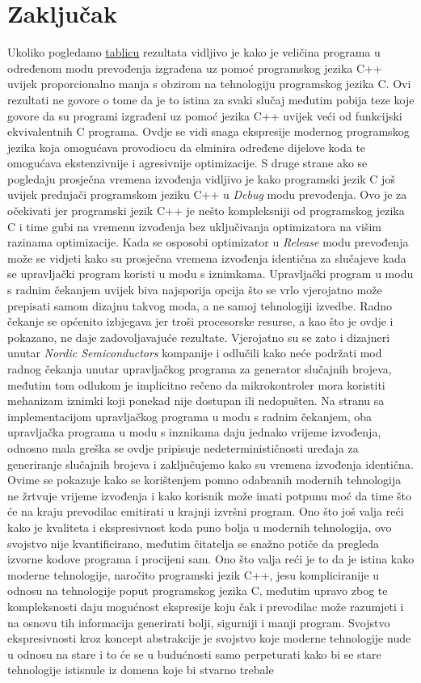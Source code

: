 \chapter{Zaključak}
Ukoliko pogledamo \hyperref[table:results]{tablicu} rezultata vidljivo je kako je veličina programa u određenom modu prevođenja izgrađena uz pomoć programskog jezika C++ uvijek proporcionalno manja s obzirom na tehnologiju programskog jezika C. Ovi rezultati ne govore o tome da je to istina za svaki slučaj međutim pobija teze koje govore da su programi izgrađeni uz pomoć jezika C++ uvijek veći od funkcijski ekvivalentnih C programa. Ovdje se vidi snaga ekspresije modernog programskog jezika koja omogućava provodiocu da elminira određene dijelove koda te omogućava ekstenzivnije i agresivnije optimizacije. S druge strane ako se pogledaju prosječna vremena izvođenja vidljivo je kako programski jezik C još uvijek prednjači programskom jeziku C++ u \textit{Debug} modu prevođenja. Ovo je za očekivati jer programski jezik C++ je nešto kompleksniji od programskog jezika C i time gubi na vremenu izvođenja bez uključivanja optimizatora na višim razinama optimizacije. Kada se osposobi optimizator u \textit{Release} modu prevođenja može se vidjeti kako su prosječna vremena izvođenja identična za slučajeve kada se upravljački program koristi u modu s iznimkama. Upravljački program u modu s radnim čekanjem uvijek biva najsporija opcija što se vrlo vjerojatno može prepisati samom dizajnu takvog moda, a ne samoj tehnologiji izvedbe. Radno čekanje se općenito izbjegava jer troši procesorske resurse, a kao što je ovdje i pokazano, ne daje zadovoljavajuće rezultate. Vjerojatno su se zato i dizajneri unutar \textit{Nordic Semiconductors} kompanije i odlučili kako neće podržati mod radnog čekanja unutar upravljačkog programa za generator slučajnih brojeva, međutim tom odlukom je implicitno rečeno da mikrokontroler mora koristiti mehanizam iznimki koji ponekad nije dostupan ili nedopušten. Na stranu sa implementacijom upravljačkog programa u modu s radnim čekanjem, oba upravljačka programa u modu s inznikama daju jednako vrijeme izvođenja, odnosno mala greška se ovdje pripisuje nedeterminističnosti uređaja za generiranje slučajnih brojeva i zaključujemo kako su vremena izvođenja identična. Ovime se pokazuje kako se korištenjem pomno odabranih modernih tehnologija ne žrtvuje vrijeme izvođenja i kako korisnik može imati potpunu moć da time što će na kraju prevodilac emitirati u krajnji izvršni program. Ono što još valja reći kako je kvaliteta i ekspresivnost koda puno bolja u modernih tehnologija, ovo svojstvo nije kvantificirano, međutim čitatelja se snažno potiče da pregleda izvorne kodove programa i procijeni sam. Ono što valja reći je to da je istina kako moderne tehnologije, naročito programski jezik C++, jesu kompliciranije u odnosu na tehnologije poput programskog jezika C, međutim upravo zbog te kompleksnosti daju mogućnost ekspresije koju čak i prevodilac može razumjeti i na osnovu tih informacija generirati bolji, sigurniji i manji program. Svojstvo ekspresivnosti kroz koncept abstrakcije je svojstvo koje moderne tehnologije nude u odnosu na stare i to će se u budućnosti samo perpeturati kako bi se stare tehnologije istisnule iz domena koje bi stvarno trebale 